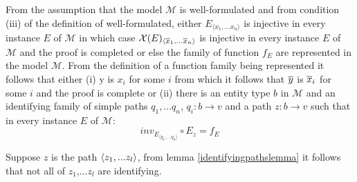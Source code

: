 \documentclass[10pt,a4paper]{article}
\newcommand{\genericmodel}{\mathcal{M}}
\newcommand{\logtophys}{\mathcal{X}}
\begin{document}
\noindent
From the assumption that the model $\genericmodel$ is well-formulated and from condition (iii) 
of the definition of well-formulated, either 
$E_{\langle x_1,...x_n \rangle}$ is injective in every instance $E$ of $\genericmodel$ in which case 
$\logtophys(E)_{\langle \phys{x}_1,...\phys{x}_n \rangle}$ is injective in every instance $E$ of $\genericmodel$ and the proof is completed or else
the family of function $f_E$ are represented in the model $\genericmodel$. From the definition of a function family being represented it follows that
either (i)  y is $x_i$ for some $i$ 
from which it follows that $\overline{y}$ is $\overline{x}_i$ for some $i$ and the proof is complete or (ii) there
is an entity type $b$ in $\genericmodel$ and an identifying family of simple paths $q_1,...q_n$, 
$q_i: b \rightarrow v$ and a 
path $z: b \rightarrow v$ such that in every instance $E$ of $\genericmodel$:
\newcommand{\ineveryinstance}{\forall E \in inst_\genericmodel ,  \hspace{0.25cm} }
\begin{equation}
\label{initialRepresentation}
inv_{E_{\langle q_1,...q_n \rangle}} \circ E_{z} = f_E
\end{equation}

Suppose $z$ is the path $\langle z_1,...z_l\rangle$, from lemma \ref{identifyingpathslemma} it follows that not all of $z_1$,...$z_l$ are identifying. \\
\end{document}
